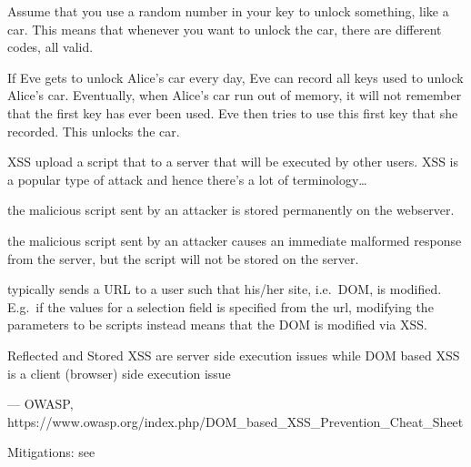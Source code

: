 \begin{definition}
    Assume that you use a random number in your key to unlock something, 
    like a car. This means that whenever you want to unlock the car, there
    are different codes, all valid. 
    
    If Eve gets to unlock Alice's car every day, Eve can record all keys used
    to unlock Alice's car. Eventually, when Alice's car run out of memory,
    it will not remember that the first key has ever been used. Eve
    then tries to use this first key that she recorded. This unlocks the car.
\end{definition}

\begin{definition}[Virus]
\end{definition}

\begin{definition}{XSS}
    upload a script that to a server that will be executed by other users.
    XSS is a popular type of attack and hence there's a lot of 
    terminology\dots
    \begin{description}[labelindent=1cm]
        \item[Stored XSS] the malicious script sent by an attacker is stored
            permanently on the webserver.
        \item[Reflected XSS] the malicious script sent by an attacker 
            causes an immediate malformed response from the server, but
            the script will not be stored on the server.
        \item[DOM-based XSS] typically sends a URL to a user such 
            that his/her site, i.e.\ DOM, is modified. E.g.\
            if the values for a selection field is specified from the url,
            modifying the parameters to be scripts instead
            means that the DOM is modified via XSS.
    \end{description}
    \epigraph{Reflected and Stored XSS are server side
    execution issues while DOM based XSS is a client (browser) side 
    execution issue}{--- \textup{OWASP}, https://www.owasp.org/index.php/DOM\_based\_XSS\_Prevention\_Cheat\_Sheet}
    

    Mitigations: see~
\end{definition}

